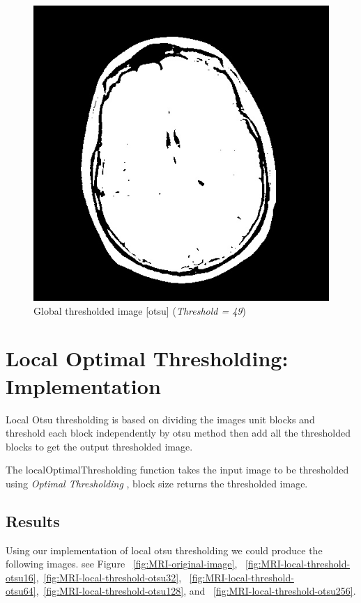 \documentclass[letterpaper, 12 pt, conference ,onecolumn]{ieeeconf}  %
\begin{document}
\begin{figure}[h!]
\includegraphics[width=0.4\paperwidth]{otsu-thresholding/global/MRI-global-threshold-otsu.jpg}
\centering
\caption{Global thresholded image [otsu]  (\textit{Threshold = 49}) }
\label{fig:MRI-global-threshold-otsu}
\end{figure}


\section*{Local Optimal Thresholding: Implementation}
Local Otsu thresholding is based on dividing the images unit blocks and threshold each block
independently by otsu method then add all the thresholded blocks to get the output thresholded image.
 
The localOptimalThresholding function takes the input image to be thresholded using \textit{Optimal Thresholding} , block size returns the thresholded image.

\subsection*{\textbf{Results}}
Using our implementation of local otsu thresholding we could produce the following images. see Figure ~\ref{fig:MRI-original-image}, ~\ref{fig:MRI-local-threshold-otsu16},~\ref{fig:MRI-local-threshold-otsu32},  ~\ref{fig:MRI-local-threshold-otsu64},~\ref{fig:MRI-local-threshold-otsu128}, and ~\ref{fig:MRI-local-threshold-otsu256}. 
\end{document}

